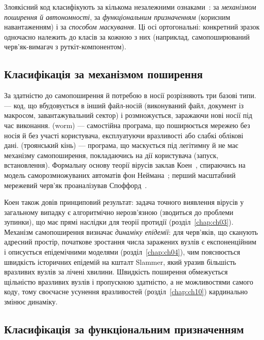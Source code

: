 Злоякісний код класифікують за кількома незалежними ознаками~\cite{ch01:grgof,aycock,szor}: за \emph{механізмом поширення й автономності}, за \emph{функціональним призначенням} (корисним навантаженням) і за \emph{способом маскування}. Ці осі ортогональні: конкретний зразок одночасно належить до класів за кожною з них (наприклад, самопоширюваний черв'як-вимагач з руткіт-компонентом).

\subsection{Класифікація за механізмом поширення}

За здатністю до самопоширення й потребою в носії розрізняють три базові типи.  --- код, що вбудовується в інший файл-носій (виконуваний файл, документ із макросом, завантажувальний сектор) і розмножується, заражаючи нові носії під час виконання.  (worm) --- самостійна програма, що поширюється мережею без носія й без участі користувача, експлуатуючи вразливості або слабкі облікові дані.  (троянський кінь) --- програма, що маскується під легітимну й не має механізму самопоширення, покладаючись на дії користувача (запуск, встановлення). Формальну основу теорії вірусів заклав Коен~\cite{ch01:cohen,ch01:cohen-thesis}, спираючись на модель саморозмножуваних автоматів фон Неймана~\cite{ch01:vonneumann}; перший масштабний мережевий черв'як проаналізував Споффорд~\cite{ch01:spafford}.

Коен також довів принциповий результат: задача точного виявлення вірусів у загальному випадку є алгоритмічно нерозв'язною (зводиться до проблеми зупинки), що має прямі наслідки для теорії протидії (розділ~\ref{chap:ch03}). Механізм самопоширення визначає \emph{динаміку епідемії}: для черв'яків, що сканують адресний простір, початкове зростання числа заражених вузлів є експоненційним і описується епідемічними моделями (розділ~\ref{chap:ch04}), чим пояснюється швидкість історичних епідемій на кшталт Slammer, який уразив більшість вразливих вузлів за лічені хвилини. Швидкість поширення обмежується щільністю вразливих вузлів і пропускною здатністю, а не можливостями самого коду, тому своєчасне усунення вразливостей (розділ~\ref{chap:ch10}) кардинально змінює динаміку.

\subsection{Класифікація за функціональним призначенням}

